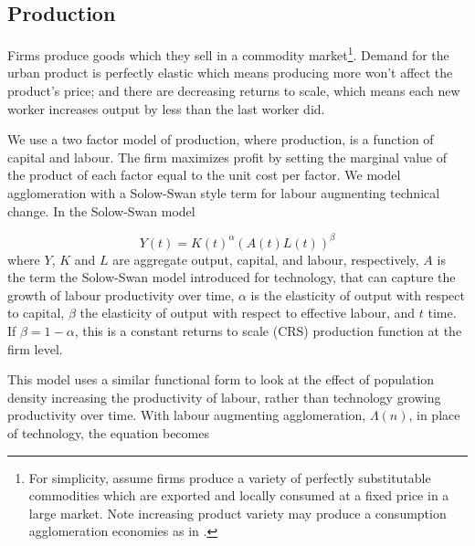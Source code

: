 \subsection{Production}

Firms produce goods which they sell in a commodity market\footnote{For simplicity, assume firms produce a variety of perfectly substitutable commodities which are exported and locally consumed at a fixed price in a large market. Note increasing product variety may produce a consumption agglomeration economies as in \cite{fujitaSpatialEconomyCities1999}.}. Demand for the urban product is perfectly elastic which means producing more won't affect the product's price; and there are decreasing returns to scale, which means each new worker increases output by less than the last worker did. 
  
We use a two factor model of production, where production, is a function of capital and labour. The firm maximizes profit by setting the marginal value of the product of each factor equal to the unit cost per factor. We model agglomeration with a Solow-Swan style term for labour augmenting technical change. In the Solow-Swan model 

\begin{equation} 
Y(t) = K(t)^{\alpha}(A(t)L(t))^{\beta}
\label{Eqn:Solow-Swann}
\end{equation}
where $Y$, $K$ and $L$ are aggregate output, capital, and labour, respectively,  $A$ is the term the Solow-Swan model introduced for technology, that can capture the growth of labour productivity over time, $\alpha$ is the elasticity of output with respect to capital, $\beta$ the elasticity of output with respect to effective labour, and $t$ time. If $\beta=1-\alpha$, this is a constant returns to scale (CRS) production function at the firm level.

 
This model uses a similar functional form to look at  the effect of population density increasing %
 the productivity of labour, rather than technology growing productivity over time. With labour augmenting agglomeration, $\Lambda(n)$, in place of technology, the equation becomes 

